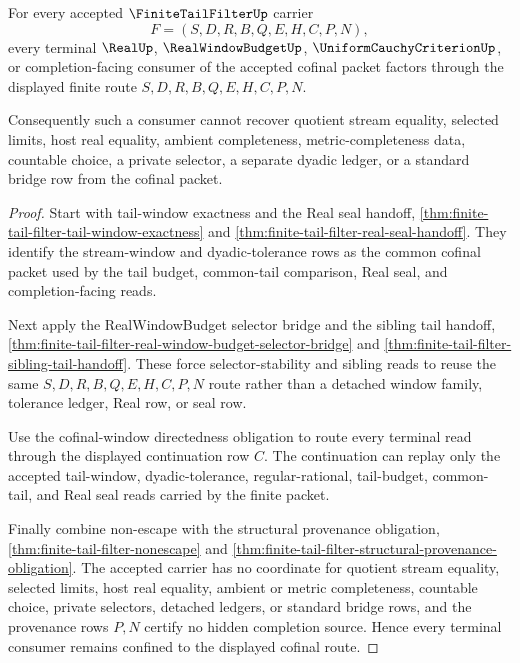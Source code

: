 \begin{theorem}
\label{thm:finite-tail-filter-terminal-cofinal-consumer-exclusion}
For every accepted $\FiniteTailFilterUp$ carrier
$$
F=(S,D,R,B,Q,E,H,C,P,N),
$$
every terminal $\RealUp$, $\RealWindowBudgetUp$, $\UniformCauchyCriterionUp$, or completion-facing consumer of the accepted cofinal packet factors through the displayed finite route $S,D,R,B,Q,E,H,C,P,N$.

Consequently such a consumer cannot recover quotient stream equality, selected limits, host real equality, ambient completeness, metric-completeness data, countable choice, a private selector, a separate dyadic ledger, or a standard bridge row from the cofinal packet.
\end{theorem}
\begin{proof}
Start with tail-window exactness and the Real seal handoff, \autoref{thm:finite-tail-filter-tail-window-exactness} and \autoref{thm:finite-tail-filter-real-seal-handoff}. They identify the stream-window and dyadic-tolerance rows as the common cofinal packet used by the tail budget, common-tail comparison, Real seal, and completion-facing reads.

Next apply the RealWindowBudget selector bridge and the sibling tail handoff, \autoref{thm:finite-tail-filter-real-window-budget-selector-bridge} and \autoref{thm:finite-tail-filter-sibling-tail-handoff}. These force selector-stability and sibling reads to reuse the same $S,D,R,B,Q,E,H,C,P,N$ route rather than a detached window family, tolerance ledger, Real row, or seal row.

Use the cofinal-window directedness obligation to route every terminal read through the displayed continuation row $C$. The continuation can replay only the accepted tail-window, dyadic-tolerance, regular-rational, tail-budget, common-tail, and Real seal reads carried by the finite packet.

Finally combine non-escape with the structural provenance obligation, \autoref{thm:finite-tail-filter-nonescape} and \autoref{thm:finite-tail-filter-structural-provenance-obligation}. The accepted carrier has no coordinate for quotient stream equality, selected limits, host real equality, ambient or metric completeness, countable choice, private selectors, detached ledgers, or standard bridge rows, and the provenance rows $P,N$ certify no hidden completion source. Hence every terminal consumer remains confined to the displayed cofinal route.
\end{proof}

